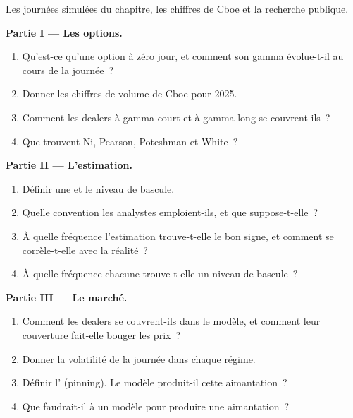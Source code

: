 \begin{problem}\label{pb:s2:zero-day-options-and-dealer-gamma-flows:1}
Les journées simulées du chapitre, les chiffres de Cboe et la recherche publique.

\medskip\noindent\textbf{Partie I --- Les options.}
\begin{enumerate}
\item Qu'est-ce qu'une option à zéro jour, et comment son gamma évolue-t-il au cours de la journée~?
\item Donner les chiffres de volume de Cboe pour 2025.
\item Comment les dealers à gamma court et à gamma long se couvrent-ils~?
\item Que trouvent Ni, Pearson, Poteshman et White~?
\end{enumerate}

\medskip\noindent\textbf{Partie II --- L'estimation.}
\begin{enumerate}[resume]
\item Définir une  et le niveau de bascule.
\item Quelle convention les analystes emploient-ils, et que suppose-t-elle~?
\item À quelle fréquence l'estimation trouve-t-elle le bon signe, et comment se corrèle-t-elle avec la réalité~?
\item À quelle fréquence chacune trouve-t-elle un niveau de bascule~?
\end{enumerate}

\medskip\noindent\textbf{Partie III --- Le marché.}
\begin{enumerate}[resume]
\item Comment les dealers se couvrent-ils dans le modèle, et comment leur couverture fait-elle bouger les prix~?
\item Donner la volatilité de la journée dans chaque régime.
\item Définir l' (pinning). Le modèle produit-il cette aimantation~?
\item Que faudrait-il à un modèle pour produire une aimantation~?
\end{enumerate}


\end{problem}
